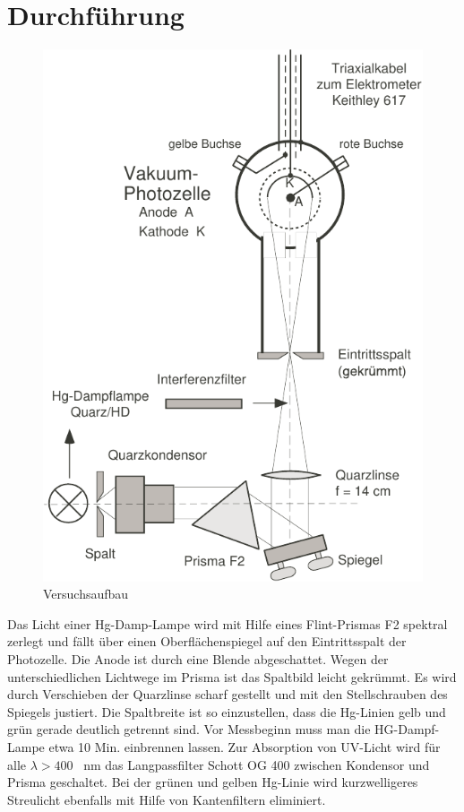 \section{Durchf\"uhrung}

\begin{figure}
    \centering
    \includegraphics[width=\linewidth]{images/aufbau.pdf}
    \caption{Versuchsaufbau}
\end{figure}

Das Licht  einer  Hg-Damp-Lampe wird mit Hilfe eines Flint-Prismas F2 spektral
zerlegt und f\"allt \"uber einen Oberfl\"achenspiegel auf  den  Eintrittsspalt
der  Photozelle.  Die Anode ist durch  eine  Blende  abgeschattet.  Wegen  der
unterschiedlichen Lichtwege  im Prisma ist das Spaltbild leicht gekr\"ummt. Es
wird   durch  Verschieben  der  Quarzlinse  scharf  gestellt   und   mit   den
Stellschrauben des Spiegels justiert.  Die  Spaltbreite  ist  so einzustellen,
dass die  Hg-Linien  gelb  und  gr\"un  gerade  deutlich  getrennt  sind.  Vor
Messbeginn muss  man  die  HG-Dampf-Lampe  etwa 10 Min. einbrennen lassen. Zur
Absorption von  UV-Licht  wird  f\"ur alle $\lambda > 400$ \SI{}{\nano\meter} das
Langpassfilter Schott OG 400 zwischen Kondensor und Prisma geschaltet. Bei der
gr\"unen  und  gelben Hg-Linie wird kurzwelligeres  Streulicht  ebenfalls  mit
Hilfe von Kantenfiltern eliminiert.


